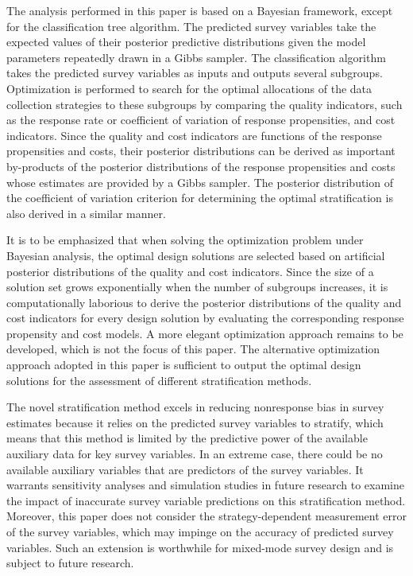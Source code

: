 \documentclass[12pt]{article}
\begin{document}
The analysis performed in this paper is based on a Bayesian framework, except for the classification tree algorithm.
The predicted survey variables take the expected values of their posterior predictive distributions given the model parameters repeatedly drawn in a Gibbs sampler.
The classification algorithm takes the predicted survey variables as inputs and outputs several subgroups.
Optimization is performed to search for the optimal allocations of the data collection strategies to these subgroups by comparing the quality indicators, such as the response rate or coefficient of variation of response propensities, and cost indicators.
Since the quality and cost indicators are functions of the response propensities and costs, their posterior distributions can be derived as important by-products of the posterior distributions of the response propensities and costs whose estimates are provided by a Gibbs sampler.
The posterior distribution of the coefficient of variation criterion for determining the optimal stratification is also derived in a similar manner.

It is to be emphasized that when solving the optimization problem under Bayesian analysis, the optimal design solutions are selected based on artificial posterior distributions of the quality and cost indicators.
Since the size of a solution set grows exponentially when the number of subgroups increases, it is computationally laborious to derive the posterior distributions of the quality and cost indicators for every design solution by evaluating the corresponding response propensity and cost models.
A more elegant optimization approach remains to be developed, which is not the focus of this paper.
The alternative optimization approach adopted in this paper is sufficient to output the optimal design solutions for the assessment of different stratification methods.

The novel stratification method excels in reducing nonresponse bias in survey estimates because it relies on the predicted survey variables to stratify, which means that this method is limited by the predictive power of the available auxiliary data for key survey variables.
In an extreme case, there could be no available auxiliary variables that are predictors of the survey variables.
It warrants sensitivity analyses and simulation studies in future research to examine the impact of inaccurate survey variable predictions on this stratification method.
Moreover, this paper does not consider the strategy-dependent measurement error of the survey variables, which may impinge on the accuracy of predicted survey variables.
Such an extension is worthwhile for mixed-mode survey design and is subject to future research.
\end{document}

